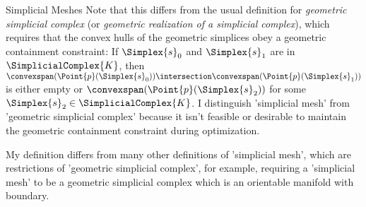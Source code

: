 \begin{plSection}{Simplicial Meshes}
Note that this differs from the usual definition for
{\it geometric simplicial complex}
(or {\it geometric realization of a simplicial complex}),
which requires that the convex hulls of the geometric
simplices obey a geometric containment constraint:
If $\Simplex{s}_0$ and $\Simplex{s}_1$ are in $\SimplicialComplex{K}$,
then $\convexspan ( \Point{p}( \Simplex{s}_0 ) ) \intersection
\convexspan ( \Point{p}( \Simplex{s}_1 ) )$
is either empty or
$\convexspan ( \Point{p}( \Simplex{s}_2 ) )$ 
for some $\Simplex{s}_2 \in \SimplicialComplex{K}$.
I distinguish 'simplicial mesh' from 'geometric simplicial complex'
because it isn't feasible or desirable to maintain the geometric
containment constraint during optimization.

My definition differs from many other definitions of 'simplicial mesh',
which are restrictions of 'geometric simplicial complex', for example,
requiring a 'simplicial mesh' to be a geometric simplicial complex
which is an orientable manifold with boundary.

\end{plSection}%
